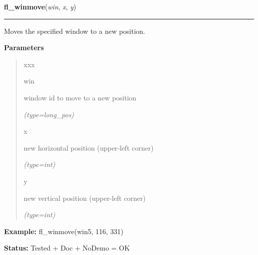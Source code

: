\hspace{.8\funcindent}\begin{boxedminipage}{\funcwidth}

    \raggedright \textbf{fl\_winmove}(\textit{win}, \textit{x}, \textit{y})

    \vspace{-1.5ex}

    \rule{\textwidth}{0.5\fboxrule}
\setlength{\parskip}{2ex}
    Moves the specified window to a new position.

\setlength{\parskip}{1ex}
      \textbf{Parameters}
      \vspace{-1ex}

      \begin{quote}
        \begin{Ventry}{xxx}

          \item[win]

          window id to move to a new position

            {\it (type=long\_pos)}

          \item[x]

          new horizontal position (upper-left corner)

            {\it (type=int)}

          \item[y]

          new vertical position (upper-left corner)

            {\it (type=int)}

        \end{Ventry}

      \end{quote}

\textbf{Example:} fl\_winmove(win5, 116, 331)



\textbf{Status:} Tested + Doc + NoDemo = OK



    \end{boxedminipage}

    \label{xformslib:flxbasic:fl_winreshape}

    \vspace{0.5ex}

